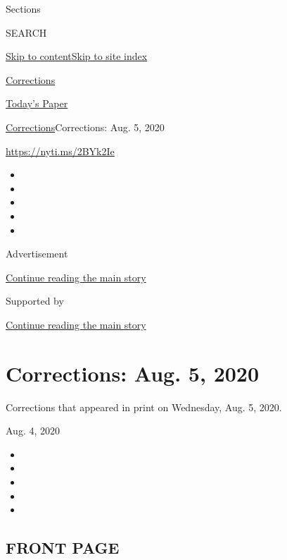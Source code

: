 Sections

SEARCH

\protect\hyperlink{site-content}{Skip to
content}\protect\hyperlink{site-index}{Skip to site index}

\href{https://www.nytimes3xbfgragh.onion/section/corrections}{Corrections}

\href{https://myaccount.nytimes3xbfgragh.onion/auth/login?response_type=cookie\&client_id=vi}{}

\href{https://www.nytimes3xbfgragh.onion/section/todayspaper}{Today's
Paper}

\href{/section/corrections}{Corrections}\textbar{}Corrections: Aug. 5,
2020

\url{https://nyti.ms/2BYk2Ie}

\begin{itemize}
\item
\item
\item
\item
\item
\end{itemize}

Advertisement

\protect\hyperlink{after-top}{Continue reading the main story}

Supported by

\protect\hyperlink{after-sponsor}{Continue reading the main story}

\hypertarget{corrections-aug-5-2020}{%
\section{Corrections: Aug. 5, 2020}\label{corrections-aug-5-2020}}

Corrections that appeared in print on Wednesday, Aug. 5, 2020.

Aug. 4, 2020

\begin{itemize}
\item
\item
\item
\item
\item
\end{itemize}

\hypertarget{front-page}{%
\subsection{FRONT PAGE}\label{front-page}}

